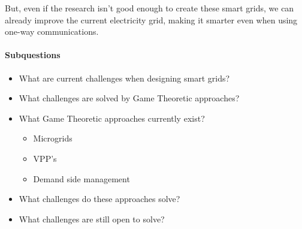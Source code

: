 But, even if the research  isn't good enough to create these smart grids, we can already improve the current electricity grid, making it smarter even when using one-way communications. \cite{AgarwalCui2012}

\paragraph{Subquestions}
\begin{itemize}
	\item What are current challenges when designing smart grids?
	\item What challenges are solved by Game Theoretic approaches?
	\item What Game Theoretic approaches currently exist?
	\begin{itemize}
		\item Microgrids
		\item VPP’s
		\item Demand side management
	\end{itemize}
	\item What challenges do these approaches solve?
	\item What challenges are still open to solve?
\end{itemize}

